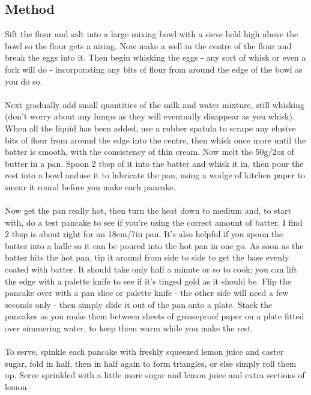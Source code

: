 \documentclass[a0,final]{a0poster}
\begin{document}
\begin{multicols}{3}
\section*{Method}
Sift the flour and salt into a large mixing bowl with a sieve held high above the bowl so the flour gets a airing. Now make a well in the centre of the flour and break the eggs into it. Then begin whisking the eggs - any sort of whisk or even a fork will do - incorporating any bits of flour from around the edge of the bowl as you do so.\\
\\
Next gradually add small quantities of the milk and water mixture, still whisking (don't worry about any lumps as they will eventually disappear as you whisk). When all the liquid has been added, use a rubber spatula to scrape any elusive bits of flour from around the edge into the centre, then whisk once more until the batter is smooth, with the consistency of thin cream. Now melt the 50g/2oz of butter in a pan. Spoon 2 tbsp of it into the batter and whisk it in, then pour the rest into a bowl anduse it to lubricate the pan, using a wodge of kitchen paper to smear it round before you make each pancake.\\
\\
Now get the pan really hot, then turn the heat down to medium and, to start with, do a test pancake to see if you're using the correct amount of batter. I find 2 tbsp is about right for an 18cm/7in pan. It's also helpful if you spoon the batter into a ladle so it can be poured into the hot pan in one go. As soon as the batter hits the hot pan, tip it around from side to side to get the base evenly coated with batter. It should take only half a minute or so to cook; you can lift the edge with a palette knife to see if it's tinged gold as it should be. Flip the pancake over with a pan slice or palette knife - the other side will need a few seconds only - then simply slide it out of the pan onto a plate.
Stack the pancakes as you make them between sheets of greaseproof paper on a plate fitted over simmering water, to keep them warm while you make the rest.\\
\\
To serve, spinkle each pancake with freshly squeezed lemon juice and caster sugar, fold in half, then in half again to form triangles, or else simply roll them up. Serve sprinkled with a little more sugar and lemon juice and extra sections of lemon.

\columnbreak


\end{multicols}
\end{document}
